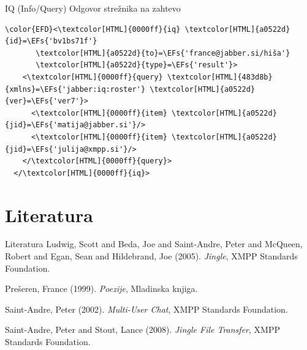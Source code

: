 \documentclass[presentation]{beamer}
\newcommand{\EFs}[1]{\textcolor{EFs}{#1}} %
\begin{document}
\begin{frame}[label={sec:org60cf44c},fragile]{IQ (Info/Query)}
 Odgovor strežnika na zahtevo

\begin{Code}
\begin{Verbatim}
\color{EFD}<\textcolor[HTML]{0000ff}{iq} \textcolor[HTML]{a0522d}{id}=\EFs{'bv1bs71f'}
       \textcolor[HTML]{a0522d}{to}=\EFs{'france@jabber.si/hiša'}
       \textcolor[HTML]{a0522d}{type}=\EFs{'result'}>
    <\textcolor[HTML]{0000ff}{query} \textcolor[HTML]{483d8b}{xmlns}=\EFs{'jabber:iq:roster'} \textcolor[HTML]{a0522d}{ver}=\EFs{'ver7'}>
      <\textcolor[HTML]{0000ff}{item} \textcolor[HTML]{a0522d}{jid}=\EFs{'matija@jabber.si'}/>
      <\textcolor[HTML]{0000ff}{item} \textcolor[HTML]{a0522d}{jid}=\EFs{'julija@xmpp.si'}/>
    </\textcolor[HTML]{0000ff}{query}>
  </\textcolor[HTML]{0000ff}{iq}>
\end{Verbatim}
\end{Code}
\end{frame}

\section{Literatura}
\label{sec:org15a6bd0}

\begin{frame}[label={sec:org6e8e701}]{Literatura}
\noindent
Ludwig, Scott and Beda, Joe and Saint-Andre, Peter and McQueen, Robert and Egan, Sean and Hildebrand, Joe (2005). \emph{Jingle}, XMPP Standards Foundation.

\noindent
Prešeren, France (1999). \emph{Poezije}, Mladinska knjiga.

\noindent
Saint-Andre, Peter (2002). \emph{Multi-User Chat}, XMPP Standards Foundation.

\noindent
Saint-Andre, Peter and Stout, Lance (2008). \emph{Jingle File Transfer}, XMPP Standards Foundation.
\end{frame}
\end{document}
